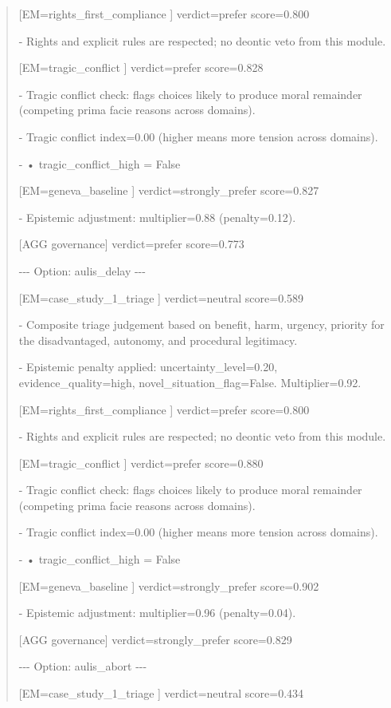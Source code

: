 \documentclass[12pt]{article}
\theoremstyle{plain}
\theoremstyle{definition}
\theoremstyle{remark}
\begin{document}
\begin{quote}
{[}EM=rights\_first\_compliance {]} verdict=prefer score=0.800

- Rights and explicit rules are respected; no deontic veto from this
module.

{[}EM=tragic\_conflict {]} verdict=prefer score=0.828

- Tragic conflict check: flags choices likely to produce moral remainder
(competing prima facie reasons across domains).

- Tragic conflict index=0.00 (higher means more tension across domains).

- • tragic\_conflict\_high = False

{[}EM=geneva\_baseline {]} verdict=strongly\_prefer score=0.827

- Epistemic adjustment: multiplier=0.88 (penalty=0.12).

{[}AGG governance{]} verdict=prefer score=0.773

-\/-\/- Option: aulis\_delay -\/-\/-

{[}EM=case\_study\_1\_triage {]} verdict=neutral score=0.589

- Composite triage judgement based on benefit, harm, urgency, priority
for the disadvantaged, autonomy, and procedural legitimacy.

- Epistemic penalty applied: uncertainty\_level=0.20,
evidence\_quality=high, novel\_situation\_flag=False. Multiplier=0.92.

{[}EM=rights\_first\_compliance {]} verdict=prefer score=0.800

- Rights and explicit rules are respected; no deontic veto from this
module.

{[}EM=tragic\_conflict {]} verdict=prefer score=0.880

- Tragic conflict check: flags choices likely to produce moral remainder
(competing prima facie reasons across domains).

- Tragic conflict index=0.00 (higher means more tension across domains).

- • tragic\_conflict\_high = False

{[}EM=geneva\_baseline {]} verdict=strongly\_prefer score=0.902

- Epistemic adjustment: multiplier=0.96 (penalty=0.04).

{[}AGG governance{]} verdict=strongly\_prefer score=0.829

-\/-\/- Option: aulis\_abort -\/-\/-

{[}EM=case\_study\_1\_triage {]} verdict=neutral score=0.434


\end{quote}
\end{document}
